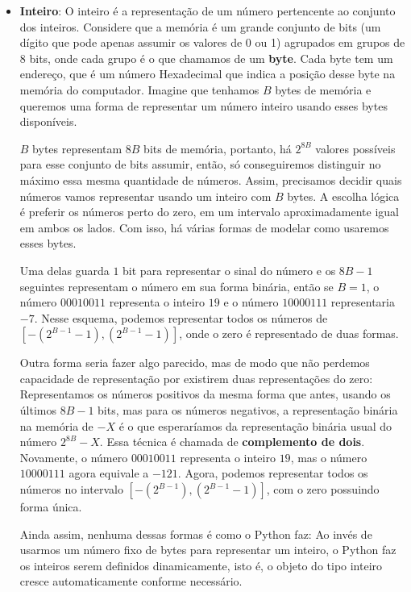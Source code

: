 \documentclass[11pt, a4paper]{article}
\begin{document}
\begin{itemize}
    \item \textbf{Inteiro}: O inteiro é a representação de um número pertencente ao conjunto dos inteiros. Considere que a memória é um grande conjunto de bits (um dígito que pode apenas assumir os valores de 0 ou 1) agrupados em grupos de 8 bits, onde cada grupo é o que chamamos de um \textbf{byte}. Cada byte tem um endereço, que é um número Hexadecimal que indica a posição desse byte na memória do computador. Imagine que tenhamos \(B\) bytes de memória e queremos uma forma de representar um número inteiro usando esses bytes disponíveis. 
    
    \(B\) bytes representam \(8B\) bits de memória, portanto, há \(2^{8B}\) valores possíveis para esse conjunto de bits assumir, então, só conseguiremos distinguir no máximo essa mesma quantidade de números. Assim, precisamos decidir quais números vamos representar usando um inteiro com \(B\) bytes. A escolha lógica é preferir os números perto do zero, em um intervalo aproximadamente igual em ambos os lados. Com isso, há várias formas de modelar como usaremos esses bytes.
    
    Uma delas guarda \(1\) bit para representar o sinal do número e os \(8B-1\) seguintes representam o número em sua forma binária, então se \(B=1\), o número \(00010011\) representa o inteiro \(19\) e o número \(10000111\) representaria \(-7\). Nesse esquema, podemos representar todos os números de \([-(2^{B-1}-1),(2^{B-1}-1)]\), onde o zero é representado de duas formas.

    Outra forma seria fazer algo parecido, mas de modo que não perdemos capacidade de representação por existirem duas representações do zero: Representamos os números positivos da mesma forma que antes, usando os últimos \(8B-1\) bits, mas para os números negativos, a representação binária na memória de \(-X\) é o que esperaríamos da representação binária usual do número \(2^{8B}-X\). Essa técnica é chamada de \textbf{complemento de dois}. Novamente, o número \(00010011\) representa o inteiro \(19\), mas o número \(10000111\) agora equivale a \(-121\). Agora, podemos representar todos os números no intervalo \([-(2^{B-1}),(2^{B-1}-1)]\), com o zero possuindo forma única.

    Ainda assim, nenhuma dessas formas é como o Python faz: Ao invés de usarmos um número fixo de bytes para representar um inteiro, o Python faz os inteiros serem definidos dinamicamente, isto é, o objeto do tipo inteiro cresce automaticamente conforme necessário.
    

\end{itemize}
\end{document}
